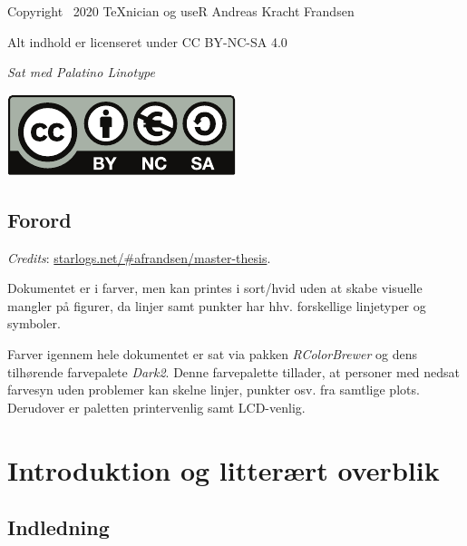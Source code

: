 \documentclass[
  a4paper,
  oneside]{memoir}
\begin{document}
\newpage

\vspace*{\fill}

Copyright \textcopyright\, 2020 \TeX nician og useR Andreas Kracht Frandsen

Alt indhold er licenseret under CC BY-NC-SA 4.0

\textit{Sat med Palatino Linotype}

\includegraphics[width=0.15\linewidth]{latex/bync}
\newpage


{
  \hypersetup{linkcolor=black}
  \tableofcontents
}

\newpage

{
  \hypersetup{linkcolor=black}
  \listoffigures

  \listoftables
}

\newpage

\hypertarget{forord}{%
\chapter*{Forord}\label{forord}}

\emph{Credits}: \href{http://starlogs.net/\#afrandsen/master-thesis}{starlogs.net/\#afrandsen/master-thesis}.

Dokumentet er i farver, men kan printes i sort/hvid uden at skabe visuelle mangler på figurer, da linjer samt punkter har hhv. forskellige linjetyper og symboler.

Farver igennem hele dokumentet er sat via pakken \emph{RColorBrewer} og dens tilhørende farvepalete \emph{Dark2}. Denne farvepalette tillader, at personer med nedsat farvesyn uden problemer kan skelne linjer, punkter osv. fra samtlige plots. Derudover er paletten printervenlig samt LCD-venlig.
\newpage


\setcounter{secnumdepth}{3}

\part{Introduktion og litterært overblik}

\hypertarget{indledning}{%
\chapter{Indledning}\label{indledning}}
\end{document}

